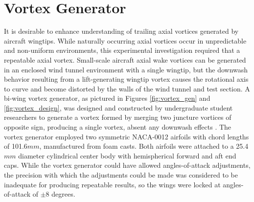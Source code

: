 \section{Vortex Generator}

It is desirable to enhance understanding of 
trailing axial vortices generated by aircraft wingtips.
While naturally occurring axial vortices occur in unpredictable and non-uniform 
environments, this experimental investigation required that a repeatable axial 
vortex.  Small-scale aircraft axial wake vortices can be generated in an 
enclosed wind tunnel environment with a single wingtip, but the downwash 
behavior resulting from a lift-generating wingtip vortex causes the rotational 
axis to curve and become distorted by the walls of the wind tunnel and
test section. A bi-wing vortex generator, as pictured in Figures 
\ref{fig:vortex_gen} and \ref{fig:vortex_design}, was designed and constructed 
by undergraduate student researchers to generate a vortex formed by merging two 
juncture vortices of opposite sign, producing a single vortex, absent any 
downwash effects \cite{davis2012}. The vortex generator employed two symmetric 
NACA-0012
airfoils with chord lengths of 101.6$mm$, manufactured from foam casts. Both 
airfoils were attached 
to a 25.4$mm$ diameter cylindrical center body with hemispherical forward and 
aft end caps. While the vortex generator could have allowed angles-of-attack 
adjustments, the precision with which the adjustments could be made was 
considered to be inadequate for producing repeatable results, so the wings were 
locked at angles-of-attack of $\pm$8 degrees.

